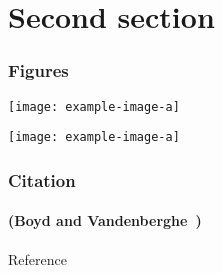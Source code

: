 \documentclass[usepdftitle=false]{beamer}
\begin{document}
\section{Second section}
\begin{frame}
    \frametitle{Figures}

    \begin{minipage}{0.5\textwidth}
        \centering
        \texttt{[image: example-image-a]}
    \end{minipage}%
    \begin{minipage}{0.5\textwidth}
        \centering
        \texttt{[image: example-image-a]}
        
    \end{minipage}
\end{frame}

\begin{frame}
    \frametitle{Citation}
    \framesubtitle{(Boyd and Vandenberghe~\cite{boyd2004convex})}

\end{frame}

\begin{frame}[plain]{Reference}
    \footnotesize
    \nocite{*}
    
\end{frame}
\end{document}
